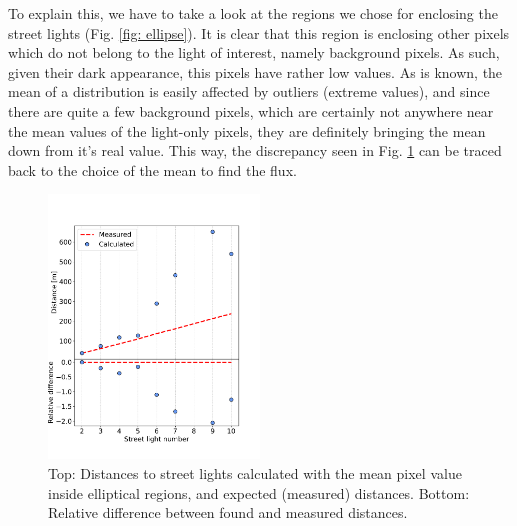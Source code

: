 \documentclass[aps,rmp,twocolumn,nofootinbib,superscriptaddress,floatfix,longbibliography]{revtex4-2}
\begin{document}
To explain this, we have to take a look at the regions we chose for enclosing the street lights (Fig. \ref{fig: ellipse}). It is clear that this region is enclosing other pixels which do not belong to the light of interest, namely background pixels. As such, given their dark appearance, this pixels have rather low values. As is known, the mean of a distribution is easily affected by outliers (extreme values), and since there are quite a few background pixels, which are certainly not anywhere near the mean values of the light-only pixels, they are definitely bringing the mean down from it's real value. This way, the discrepancy seen in Fig. \ref{fig: Mean0} can be traced back to the choice of the mean to find the flux.
\begin{figure}[h]
    \centering
    \includegraphics[width=0.5\textwidth]{Images/PlotMean.pdf}
    \caption{Top: Distances to street lights calculated with the mean pixel value inside elliptical regions, and expected (measured) distances. Bottom: Relative difference between found and measured distances.}
    \label{fig: Mean0}
\end{figure}
\end{document}
